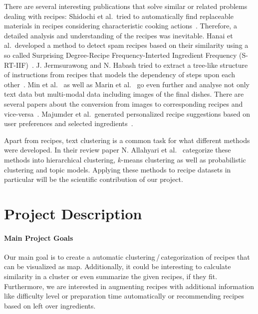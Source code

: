 \documentclass[
     12pt,         %
     a4paper,      %
     BCOR10mm,     %
     DIV14,        %
     ]{article}
\begin{document}
There are several interesting publications that solve similar or related problems dealing with recipes: Shidochi et al.~tried to automatically find replaceable materials in recipes considering characteristic cooking actions~\cite{replaceablematerials}. Therefore, a detailed analysis and understanding of the recipes was inevitable. Hanai et al.~developed a method to detect spam recipes based on their similarity using a so called Surprising Degree-Recipe Frequency-Interted Ingredient Frequency (S-RT-IIF)~\cite{recipesspam}. J. Jermsurawong and N. Habash tried to extract a tree-like structure of instructions from recipes that models the dependency of steps upon each other~\cite{recipestructure}. Min et al.~\cite{multimodal} as well as Marin et al.~\cite{marin2019recipe1m} go even further and analyse not only text data but multi-modal data including images of the final dishes. There are several papers about the conversion from images to corresponding recipes and vice-versa~\cite{marin2019recipe1m, 8099810}. Majumder et al.~generated personalized recipe suggestions based on user preferences and selected ingredients~\cite{majumder-etal-2019-generating}.

Apart from recipes, text clustering is a common task for what different methods were developed. In their review paper N. Allahyari et al.~\cite{clusteringreview} categorize these methods into hierarchical clustering, $k$-means clustering as well as probabilistic clustering and topic models. Applying these methods to recipe datasets in particular will be the scientific contribution of our project.




\section{Project Description}
\label{sec:project}

\paragraph{Main Project Goals} Our main goal is to create a automatic clustering\,/\,categorization  of recipes that can be visualized as map.  Additionally, it could be interesting to calculate similarity in a cluster or even summarize the given recipes, if they fit. Furthermore, we are interested in augmenting recipes with
additional information like difficulty level or preparation time automatically or recommending recipes based on left over ingredients.
\end{document}
